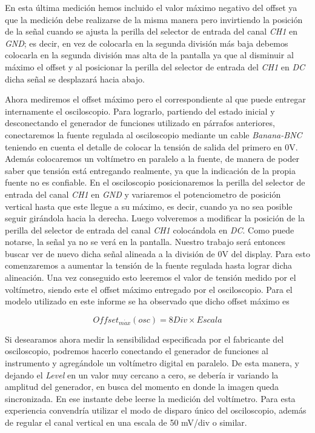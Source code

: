 \documentclass{article}
\begin{document}
\noindent En esta última medición hemos incluido el valor máximo negativo del offset ya que la medición debe realizarse de la misma manera pero invirtiendo la posición de la señal cuando se ajusta la perilla del selector de entrada del canal \textit{CH1} en \textit{GND}; es decir, en vez de colocarla en la segunda división más baja debemos colocarla en la segunda división mas alta de la pantalla ya que al disminuir al máximo el offset y al posicionar la perilla del selector de entrada del \textit{CH1} en \textit{DC} dicha señal se desplazará hacia abajo.
	\par
	Ahora mediremos el offset máximo pero el correspondiente al que puede entregar internamente el osciloscopio. Para lograrlo, partiendo del estado inicial y desconectando el generador de funciones utilizado en párrafos anteriores, conectaremos la fuente regulada al osciloscopio mediante un cable \textit{Banana-BNC} teniendo en cuenta el detalle de colocar la tensión de salida del primero en 0V. Además colocaremos un voltímetro en paralelo a la fuente, de manera de poder saber que tensión está entregando realmente, ya que la indicación de la propia fuente no es confiable. En el osciloscopio posicionaremos la perilla del selector de entrada del canal \textit{CH1} en \textit{GND} y variaremos el potenciometro de posición vertical hasta que este llegue a su máximo, es decir, cuando ya no sea posible seguir girándola hacia la derecha. Luego volveremos a modificar la posición de la perilla del selector de entrada del canal \textit{CH1} colocándola en \textit{DC}. Como puede notarse, la señal ya no se verá en la pantalla. Nuestro trabajo será entonces buscar ver de nuevo dicha señal alineada a la división de 0V del display. Para esto comenzaremos a aumentar la tensión de la fuente regulada hasta lograr dicha alineación. Una vez conseguido esto leeremos el valor de tensión medido por el voltímetro, siendo este el offset máximo entregado por el osciloscopio. Para el modelo utilizado en este informe se ha observado que dicho offset máximo es 

\begin{equation*}
	Offset_{m\acute{a}x}(osc) = 8 Div \times Escala
\end{equation*}
\medskip


	Si desearamos ahora medir la sensibilidad especificada por el fabricante del osciloscopio, podremos hacerlo conectando el generador de funciones al instrumento y agregándole un voltímetro digital en paralelo. De esta manera, y dejando el \textit{Level} en un valor muy cercano a cero, se debería ir variando la amplitud del generador, en busca del momento en donde la imagen queda sincronizada. En ese instante debe leerse la medición del voltímetro. Para esta experiencia convendría utilizar el modo de disparo único del osciloscopio, además de regular el canal vertical en una escala de 50 mV/div o similar.
\bigskip
\end{document}

